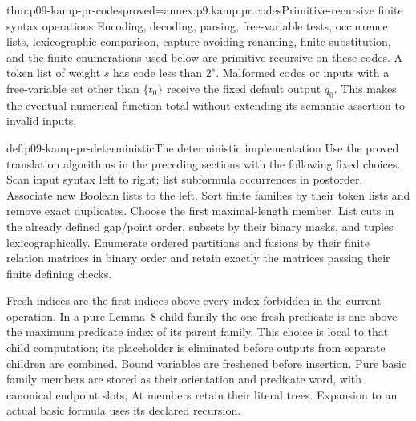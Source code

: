 \begin{hblemma}{thm:p09-kamp-pr-codes}{proved=annex:p9.kamp.pr.codes}{Primitive-recursive finite syntax operations}
Encoding, decoding, parsing, free-variable tests, occurrence lists,
lexicographic comparison, capture-avoiding renaming, finite substitution,
and the finite enumerations used below are primitive recursive on these
codes. A token list of weight \(s\) has code less than \(2^s\).
Malformed codes or inputs with a free-variable set other than
\(\{t_0\}\) receive the fixed default output \(q_0\).
This makes the eventual numerical function total without extending
its semantic assertion to invalid inputs.
\end{hblemma}

\begin{hbdefinition}{def:p09-kamp-pr-deterministic}{The deterministic implementation}
Use the proved translation algorithms in the preceding sections with
the following fixed choices. Scan input syntax left to right; list
subformula occurrences in postorder. Associate new Boolean lists to
the left. Sort finite families by their token lists and remove exact
duplicates. Choose the first maximal-length member. List cuts in the
already defined gap/point order, subsets by their binary masks, and
tuples lexicographically. Enumerate ordered partitions and fusions by
their finite relation matrices in binary order and retain exactly the
matrices passing their finite defining checks.

Fresh indices are the first indices above every index forbidden in
the current operation. In a pure Lemma~8 child family the one fresh
predicate is one above the maximum predicate index of its parent
family. This choice is local to that child computation; its placeholder
is eliminated before outputs from separate children are combined.
Bound variables are freshened before insertion. Pure basic family
members are stored as their orientation and predicate word, with
canonical endpoint slots; At members retain their literal trees.
Expansion to an actual basic formula uses its declared recursion.


\end{hbdefinition}

